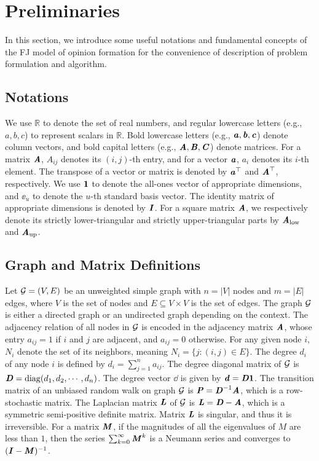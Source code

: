 
\section{Preliminaries}\label{sec:prelim}
In this section, we introduce some useful notations and fundamental concepts of the FJ model of opinion formation for the convenience of description of problem formulation and algorithm.


\subsection{Notations}
We use $\mathbb{R}$ to denote the set of real numbers, and regular lowercase letters
(e.g., $a,b,c$) to represent scalars in $\mathbb{R}$.
Bold lowercase letters (e.g., $\aaa,\bb,\cc$) denote column vectors, and bold capital
letters (e.g., $\AA,\BB,\CC$) denote matrices.
For a matrix $\AA$, $A_{ij}$ denotes its $(i,j)$-th entry, and for a vector $\aaa$,
$a_i$ denotes its $i$-th element.
The transpose of a vector or matrix is denoted by $\aaa^\top$ and $\AA^\top$,
respectively.
We use $\one$ to denote the all-ones vector of appropriate dimensions, and
$\ee_u$ to denote the $u$-th standard basis vector.
The identity matrix of appropriate dimensions is denoted by $\II$.
For a square matrix $\AA$, we respectively denote 
its strictly lower-triangular and strictly upper-triangular parts by $\AA_{\mathrm{low}}$ and $\AA_{\mathrm{up}}$.




\subsection{Graph and Matrix Definitions}
Let $\calG = (V,E)$ be an unweighted simple graph with $n = |V|$ nodes and  $m = |E|$ edges, where $V$ is the set of nodes and $E \subseteq V \times V$ is the set of edges. The graph $\calG$ is either a directed graph or an undirected graph depending on the context. The adjacency relation of all nodes in $\calG$ is encoded in the adjacency matrix $\AA$,  whose entry $a_{i j}=1$ if $i$ and $j$ are adjacent, and $a_{i j}=0$ otherwise. For any given node $i$, $N_i$ denote the  set  of its neighbors, meaning $N_i =\{ j: (i,j)\in E\}$. The degree \(d_i\) of any node \(i\) is defined by \(d_i=\sum_{j=1}^n a_{ij}\). The degree diagonal matrix of $\calG$ is $\DD={\rm diag}(d_1, d_2, \cdots, d_n)$. The degree vector $\dd$ is given by $\dd = \DD\one$. The transition matrix of an unbiased random walk on graph $\calG$ is $\PP = \DD^{-1} \AA$, which is a row-stochastic matrix. The Laplacian matrix $\LL$ of $\calG$ is $\LL = \DD - \AA$, which is a symmetric semi-positive definite matrix. Matrix $\LL$ is singular, and thus it is irreversible. For a matrix $\MM$, if the magnitudes of all the eigenvalues of $M$ are less than $1$, then the series $\sum_{k=0}^\infty \MM^k$ is a Neumann series and converges to \( (\II - \MM)^{-1} \). 

